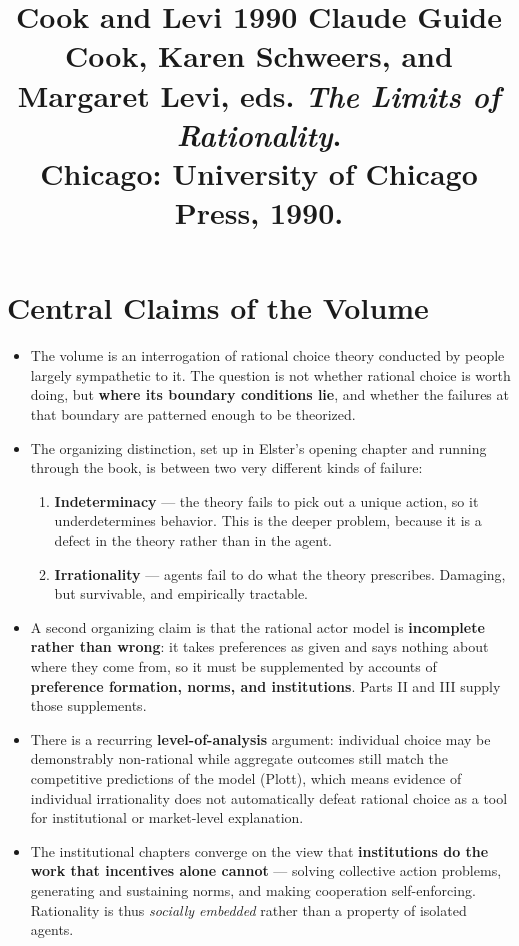 \documentclass[12pt]{article}
\title{\textbf{Cook and Levi 1990 Claude Guide}\\
\large Cook, Karen Schweers, and Margaret Levi, eds. \textit{The Limits of Rationality}.\\
Chicago: University of Chicago Press, 1990.}
\author{}
\date{}
\begin{document}
\maketitle
\tableofcontents
\newpage

\section{Central Claims of the Volume}

\begin{itemize}[leftmargin=*, itemsep=4pt]
    \item The volume is an interrogation of rational choice theory conducted by
    people largely sympathetic to it. The question is not whether rational
    choice is worth doing, but \textbf{where its boundary conditions lie}, and
    whether the failures at that boundary are patterned enough to be
    theorized.
    \item The organizing distinction, set up in Elster's opening chapter and
    running through the book, is between two very different kinds of failure:
    \begin{enumerate}
        \item \textbf{Indeterminacy} --- the theory fails to pick out a unique
        action, so it underdetermines behavior. This is the deeper problem,
        because it is a defect in the theory rather than in the agent.
        \item \textbf{Irrationality} --- agents fail to do what the theory
        prescribes. Damaging, but survivable, and empirically tractable.
    \end{enumerate}
    \item A second organizing claim is that the rational actor model is
    \textbf{incomplete rather than wrong}: it takes preferences as given and
    says nothing about where they come from, so it must be supplemented by
    accounts of \textbf{preference formation, norms, and institutions}. Parts II
    and III supply those supplements.
    \item There is a recurring \textbf{level-of-analysis} argument: individual
    choice may be demonstrably non-rational while aggregate outcomes still
    match the competitive predictions of the model (Plott), which means
    evidence of individual irrationality does not automatically defeat rational
    choice as a tool for institutional or market-level explanation.
    \item The institutional chapters converge on the view that
    \textbf{institutions do the work that incentives alone cannot} --- solving
    collective action problems, generating and sustaining norms, and making
    cooperation self-enforcing. Rationality is thus \emph{socially embedded}
    rather than a property of isolated agents.
\end{itemize}
\end{document}
